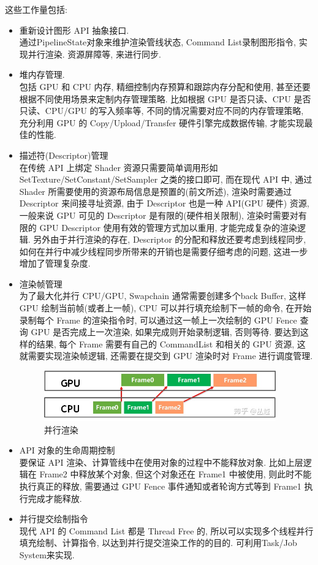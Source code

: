 \documentclass[UTF8]{ctexart}
\begin{document}
这些工作量包括:
\begin{itemize}
\item 重新设计图形 API 抽象接口.
  \\通过PipelineState对象来维护渲染管线状态, Command List录制图形指令, 实现并行渲染. 资源屏障等, 来进行同步.

\item 堆内存管理.
  \\包括 GPU 和 CPU 内存, 精细控制内存预算和跟踪内存分配和使用, 甚至还要根据不同使用场景来定制内存管理策略. 比如根据 GPU 是否只读、CPU 是否只读、CPU/GPU 的写入频率等, 不同的情况需要对应不同的内存管理策略, 充分利用 GPU 的 Copy/Upload/Transfer 硬件引擎完成数据传输, 才能实现最佳的性能.

\item 描述符(Descriptor)管理
  \\在传统 API 上绑定 Shader 资源只需要简单调用形如 SetTexture/SetConstant/SetSampler 之类的接口即可, 而在现代 API 中, 通过 Shader 所需要使用的资源布局信息是预置的(前文所述), 渲染时需要通过 Descriptor 来间接寻址资源, 由于 Descriptor 也是一种 API(GPU 硬件) 资源, 一般来说 GPU 可见的 Descriptor 是有限的(硬件相关限制), 渲染时需要对有限的 GPU Descriptor 使用有效的管理方式加以重用, 才能完成复杂的渲染逻辑. 另外由于并行渲染的存在, Descriptor 的分配和释放还要考虑到线程同步, 如何在并行中减少线程同步所带来的开销也是需要仔细考虑的问题, 这进一步增加了管理复杂度.

\item 渲染帧管理
  \\为了最大化并行 CPU/GPU, Swapchain 通常需要创建多个back Buffer, 这样 GPU 绘制当前帧(或者上一帧), CPU 可以并行填充绘制下一帧的命令, 在开始录制每个 Frame 的渲染指令时, 可以通过这一帧上一次绘制的 GPU Fence 查询 GPU 是否完成上一次渲染, 如果完成则开始录制逻辑, 否则等待. 要达到这样的结果, 每个 Frame 需要有自己的 CommandList 和相关的 GPU 资源, 这就需要实现渲染帧逻辑, 还需要在提交到 GPU 渲染时对 Frame 进行调度管理.
  \begin{figure}[H]
    \includegraphics[width=10cm]{frame_management.jpg}
    \centering
    \caption{并行渲染}
    \label{fig:parallel_rendering}
  \end{figure}

\item API 对象的生命周期控制
  \\要保证 API 渲染、计算管线中在使用对象的过程中不能释放对象. 比如上层逻辑在 Frame2 中释放某个对象, 但这个对象还在 Frame1 中被使用, 则此时不能执行真正的释放, 需要通过 GPU Fence 事件通知或者轮询方式等到 Frame1 执行完成才能释放.

\item 并行提交绘制指令
  \\现代 API 的 Command List 都是 Thread Free 的, 所以可以实现多个线程并行填充绘制、计算指令, 以达到并行提交渲染工作的的目的. 可利用Task/Job System来实现.
\end{itemize}
\end{document}
